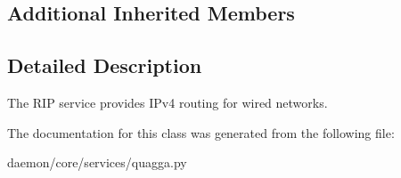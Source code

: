 \subsection*{Additional Inherited Members}


\subsection{Detailed Description}
\begin{DoxyVerb}The RIP service provides IPv4 routing for wired networks.
\end{DoxyVerb}
 

The documentation for this class was generated from the following file\+:\begin{DoxyCompactItemize}
\item 
daemon/core/services/quagga.\+py\end{DoxyCompactItemize}
